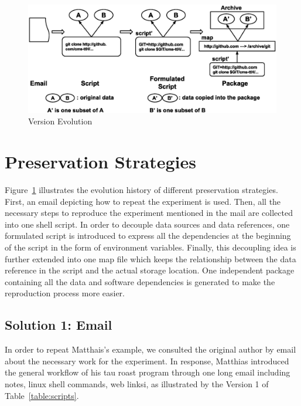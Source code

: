 \documentclass{acm_proc_article-sp}
\begin{document}
\begin{figure}
\centering
\includegraphics[width=1.6\columnwidth]{version-evolution.eps}
\caption{Version Evolution}
\label{fig:version-evolution}
\end{figure}

\section{Preservation Strategies}

Figure~\ref{fig:version-evolution} illustrates the evolution history of
different preservation strategies. First, an email depicting how to repeat the
experiment is used. Then, all the necessary steps to reproduce the experiment
mentioned in the mail are collected into one shell script. In order to decouple
data sources and data references, one formulated script is introduced
to express all the dependencies at the beginning of the script in the form of
environment variables. Finally, this decoupling idea is further extended into
one map file which keeps the relationship between the data reference in the
script and the actual storage location. One independent package containing all
the data and software dependencies is generated to make the reproduction
process more easier.  

\subsection{Solution 1: Email}

In order to repeat Matthais's example, we consulted the original
author by email about the necessary work for the experiment. In response,
Matthias introduced the general workflow of his tau roast program through one long
email including notes, linux shell commands, web linksi, as illustrated by the Version 1 of
Table~\ref{table:scripts}.
\end{document}
